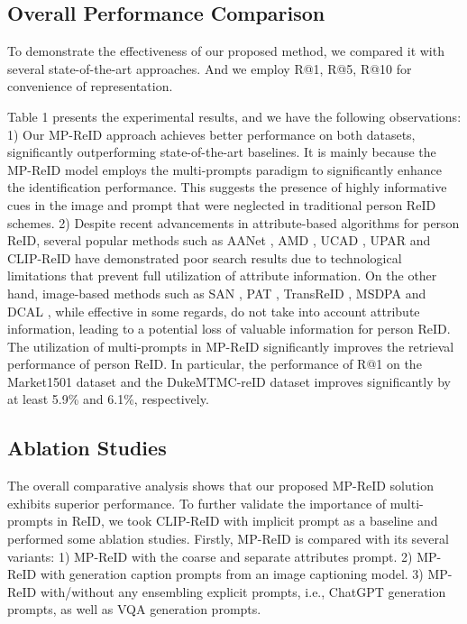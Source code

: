\documentclass[letterpaper]{article} %
\begin{document}
\subsection{Overall Performance Comparison}\label{sec:expcompare}
To demonstrate the effectiveness of our proposed method, we compared it with several state-of-the-art approaches. And we employ R@1, R@5, R@10 for convenience of representation.

Table 1 presents the experimental results, and we have the following observations: 1) Our MP-ReID approach achieves better performance on both datasets, significantly outperforming state-of-the-art baselines. It is mainly because the MP-ReID model employs the multi-prompts paradigm to significantly enhance the identification performance. This suggests the presence of highly informative cues in the image and prompt that were neglected in traditional person ReID schemes. 2) Despite recent advancements in attribute-based algorithms for person ReID, several popular methods such as AANet \cite{chen2021explainable}, AMD \cite{chen2021explainable}, UCAD \cite{sun2018beyond}, UPAR \cite{specker2023upar} and CLIP-ReID \cite{li2022clip} have demonstrated poor search results due to technological limitations that prevent full utilization of attribute information. On the other hand, image-based methods such as SAN \cite{jin2020semantics}, PAT \cite{li2021diverse}, TransReID \cite{he2021transreid}, MSDPA \cite{cheng2022more} and DCAL \cite{zhu2022dual}, while effective in some regards, do not take into account attribute information, leading to a potential loss of valuable information for person ReID. The utilization of multi-prompts in MP-ReID significantly improves the retrieval performance of person ReID. In particular, the performance of R@1 on the Market1501 dataset and the DukeMTMC-reID dataset improves significantly by at least 5.9\% and 6.1\%, respectively.

\subsection{Ablation Studies}\label{abstudy}
The overall comparative analysis shows that our proposed MP-ReID solution exhibits superior performance. To further validate the importance of multi-prompts in ReID, we took CLIP-ReID with implicit prompt as a baseline and performed some ablation studies. Firstly, MP-ReID is compared with its several variants: 1) MP-ReID with the coarse and separate attributes prompt. 2) MP-ReID with generation caption prompts from an image captioning model. 3) MP-ReID with/without any ensembling explicit prompts, i.e., ChatGPT generation prompts, as well as VQA generation prompts.
\end{document}
